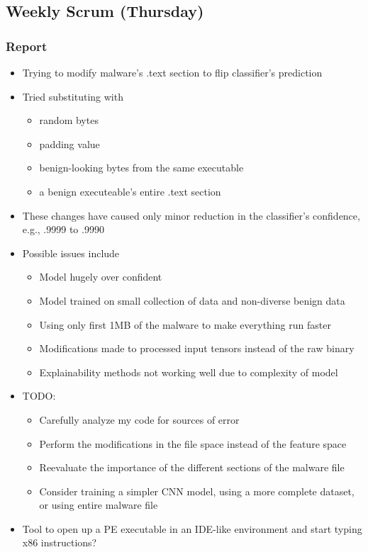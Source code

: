 \documentclass{article}
\begin{document}
\subsection*{Weekly Scrum (Thursday)}
\subsubsection*{Report}
\begin{itemize}
	\item Trying to modify malware's .text section to flip classifier's prediction
	\item Tried substituting with 
	\begin{itemize}
		\item random bytes
		\item padding value
		\item benign-looking bytes from the same executable
		\item a benign executeable's entire .text section
	\end{itemize}
	\item These changes have caused only minor reduction in the classifier's confidence, e.g., .9999 to .9990
	\item Possible issues include
	\begin{itemize}
		\item Model hugely over confident
		\item Model trained on small collection of data and non-diverse benign data
		\item Using only first 1MB of the malware to make everything run faster
		\item Modifications made to processed input tensors instead of the raw binary
		\item Explainability methods not working well due to complexity of model
	\end{itemize}
	\item TODO:
	\begin{itemize}
		\item Carefully analyze my code for sources of error
		\item Perform the modifications in the file space instead of the feature space
		\item Reevaluate the importance of the different sections of the malware file
		\item Consider training a simpler CNN model, using a more complete dataset, or using entire malware file
	\end{itemize}
	\item Tool to open up a PE executable in an IDE-like environment and start typing x86 instructions?
\end{itemize}
\end{document}
